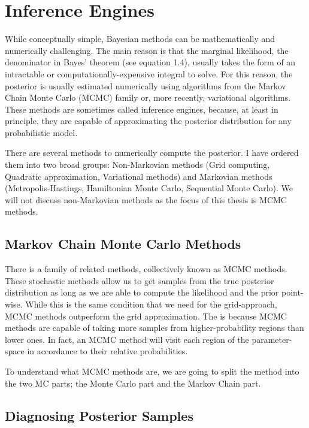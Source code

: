 \chapter{Inference Engines}\label{chap:infeng}

While conceptually simple, Bayesian methods can be mathematically and numerically challenging. The main reason is that the marginal likelihood, the denominator in Bayes' theorem (see equation 1.4), usually takes the form of an intractable or computationally-expensive integral to solve. For this reason, the posterior is usually estimated numerically using algorithms from the Markov Chain Monte Carlo (MCMC) family or, more recently, variational algorithms. These methods are sometimes called inference engines, because, at least in principle, they are capable of approximating the posterior distribution for any probabilistic model. 

There are several methods to numerically compute the posterior. I have ordered them into two broad groups: Non-Markovian methods (Grid computing, Quadratic approximation, Variational methods) and Markovian methods (Metropolis-Hastings, Hamiltonian Monte Carlo, Sequential Monte Carlo). We will not discuss non-Markovian methods as the focus of this thesis is MCMC methods.

\section{Markov Chain Monte Carlo Methods}

There is a family of related methods, collectively known as MCMC methods. These stochastic methods allow us to get samples from the true posterior distribution as long as we are able to compute the likelihood and the prior point-wise. While this is the same condition that we need for the grid-approach, MCMC methods outperform the grid approximation. The is because MCMC methods are capable of taking more samples from higher-probability regions than lower ones. In fact, an MCMC method will visit each region of the parameter-space in accordance to their relative probabilities.

To understand what MCMC methods are, we are going to split the method into the two MC parts; the Monte Carlo part and the Markov Chain part.

\section{Diagnosing Posterior Samples}


